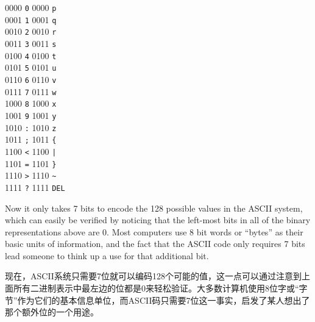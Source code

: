 \begin{tabbing}
  0000 \>\verb+0+     0000 \>\verb+p+  \\ 
  0001 \>\verb+1+     0001 \>\verb+q+  \\ 
  0010 \>\verb+2+     0010 \>\verb+r+  \\ 
  0011 \>\verb+3+     0011 \>\verb+s+  \\ 
  0100 \>\verb+4+     0100 \>\verb+t+  \\ 
  0101 \>\verb+5+     0101 \>\verb+u+  \\ 
  0110 \>\verb+6+     0110 \>\verb+v+  \\ 
  0111 \>\verb+7+     0111 \>\verb+w+  \\ 
  1000 \>\verb+8+     1000 \>\verb+x+  \\ 
  1001 \>\verb+9+     1001 \>\verb+y+  \\ 
  1010 \>\verb+:+     1010 \>\verb+z+  \\ 
  1011 \>\verb+;+     1011 \>\verb+{+  \\ 
  1100 \>\verb+<+     1100 \>\verb+|+  \\ 
  1101 \>\verb+=+     1101 \>\verb+}+  \\ 
  1110 \>\verb+>+     1110 \>\verb+~+  \\ 
  1111 \>\verb+?+     1111 \>\verb+DEL+  \\ 
\end{tabbing}

\renewcommand{\baselinestretch}{1.3}
\renewcommand{\arraystretch}{.77}


\small \normalsize



Now it only takes 7 bits to encode the 128 possible values in the
ASCII system, which can easily be verified by noticing that the left-most
bits in all of the binary representations above are 0.   Most computers 
use 8 bit words or ``bytes'' as their basic units of information, and the
fact that the ASCII code only requires 7 bits lead someone to think up 
a use for that additional bit.

现在，ASCII系统只需要7位就可以编码128个可能的值，这一点可以通过注意到上面所有二进制表示中最左边的位都是0来轻松验证。大多数计算机使用8位字或“字节”作为它们的基本信息单位，而ASCII码只需要7位这一事实，启发了某人想出了那个额外位的一个用途。

